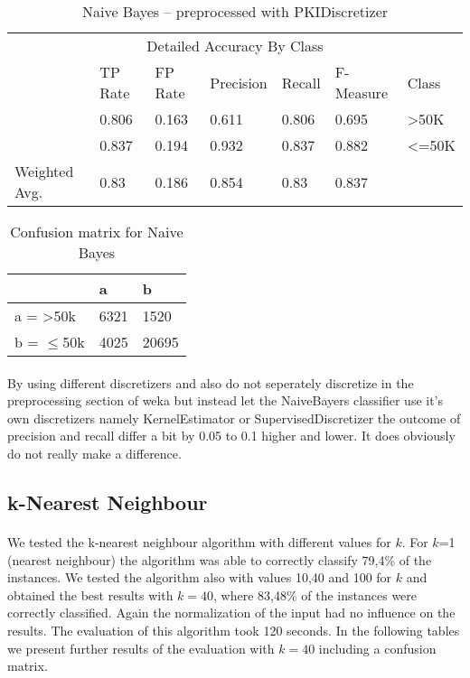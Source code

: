 \documentclass[paper=a4, fontsize=11pt]{scrartcl} %
\numberwithin{equation}{section} %
\numberwithin{figure}{section} %
\numberwithin{table}{section} %
\begin{document}
\begin{table*}[htb]\centering
  \begin{tabular*}{\columnwidth}{@{}lllllll@{}}
      \toprule 
      \multicolumn{7}{c}{Detailed Accuracy By Class} \\ 
               &  TP Rate & FP Rate & Precision & Recall & F-Measure & Class \\   \midrule
               &  0.806   & 0.163   & 0.611     & 0.806  & 0.695     & >50K  \\
               &  0.837   & 0.194   & 0.932     & 0.837  & 0.882     & <=50K \\
Weighted Avg.  &  0.83    & 0.186   & 0.854     & 0.83   & 0.837     &       \\   \bottomrule
    \end{tabular*}
\caption{Naive Bayes -- preprocessed with PKIDiscretizer} 
\label{tab:adult:bayes:1d}
\end{table*}



\begin{table}[h]
\centering
\begin{tabular}{|l|ll|}
\hline
              &    a &     b \\
\hline
 a = >50k      & 6321 &1520   \\
 b = $\leq$50k & 4025 &20695 \\
\hline
\end{tabular}
\caption{Confusion matrix for Naive Bayes}
\label{tab:adult:bayes:1c}
\end{table}

\paragraph{}By using different discretizers and also do not seperately discretize in the preprocessing section of weka but instead let the NaiveBayers classifier use it's own discretizers namely KernelEstimator or SupervisedDiscretizer the outcome of precision and recall differ a bit by 0.05 to 0.1 higher and lower. It does obviously do not really make a difference.



\subsection{k-Nearest Neighbour}

\paragraph{}We tested the k-nearest neighbour algorithm with different values for $k$. For $k$=1 (nearest neighbour) the algorithm was able to correctly classify 79,4\% of the instances. We tested the algorithm also with values 10,40 and 100 for $k$ and obtained the best results with $k=40$, where 83,48\% of the instances were correctly classified. Again the normalization of the input had no influence on the results. The evaluation of this algorithm took 120 seconds. In the following tables we present further results of the evaluation with $k=40$ including a confusion matrix.
\end{document}
